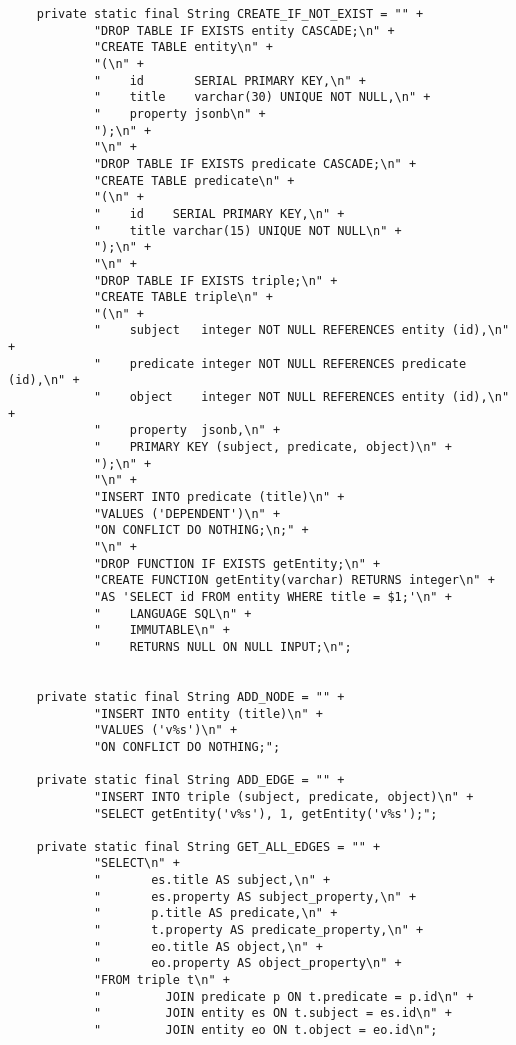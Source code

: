 \begin{lstlisting}
    private static final String CREATE_IF_NOT_EXIST = "" +
            "DROP TABLE IF EXISTS entity CASCADE;\n" +
            "CREATE TABLE entity\n" +
            "(\n" +
            "    id       SERIAL PRIMARY KEY,\n" +
            "    title    varchar(30) UNIQUE NOT NULL,\n" +
            "    property jsonb\n" +
            ");\n" +
            "\n" +
            "DROP TABLE IF EXISTS predicate CASCADE;\n" +
            "CREATE TABLE predicate\n" +
            "(\n" +
            "    id    SERIAL PRIMARY KEY,\n" +
            "    title varchar(15) UNIQUE NOT NULL\n" +
            ");\n" +
            "\n" +
            "DROP TABLE IF EXISTS triple;\n" +
            "CREATE TABLE triple\n" +
            "(\n" +
            "    subject   integer NOT NULL REFERENCES entity (id),\n" +
            "    predicate integer NOT NULL REFERENCES predicate (id),\n" +
            "    object    integer NOT NULL REFERENCES entity (id),\n" +
            "    property  jsonb,\n" +
            "    PRIMARY KEY (subject, predicate, object)\n" +
            ");\n" +
            "\n" +
            "INSERT INTO predicate (title)\n" +
            "VALUES ('DEPENDENT')\n" +
            "ON CONFLICT DO NOTHING;\n;" +
            "\n" +
            "DROP FUNCTION IF EXISTS getEntity;\n" +
            "CREATE FUNCTION getEntity(varchar) RETURNS integer\n" +
            "AS 'SELECT id FROM entity WHERE title = $1;'\n" +
            "    LANGUAGE SQL\n" +
            "    IMMUTABLE\n" +
            "    RETURNS NULL ON NULL INPUT;\n";


    private static final String ADD_NODE = "" +
            "INSERT INTO entity (title)\n" +
            "VALUES ('v%s')\n" +
            "ON CONFLICT DO NOTHING;";

    private static final String ADD_EDGE = "" +
            "INSERT INTO triple (subject, predicate, object)\n" +
            "SELECT getEntity('v%s'), 1, getEntity('v%s');";

    private static final String GET_ALL_EDGES = "" +
            "SELECT\n" +
            "       es.title AS subject,\n" +
            "       es.property AS subject_property,\n" +
            "       p.title AS predicate,\n" +
            "       t.property AS predicate_property,\n" +
            "       eo.title AS object,\n" +
            "       eo.property AS object_property\n" +
            "FROM triple t\n" +
            "         JOIN predicate p ON t.predicate = p.id\n" +
            "         JOIN entity es ON t.subject = es.id\n" +
            "         JOIN entity eo ON t.object = eo.id\n";


\end{lstlisting}
